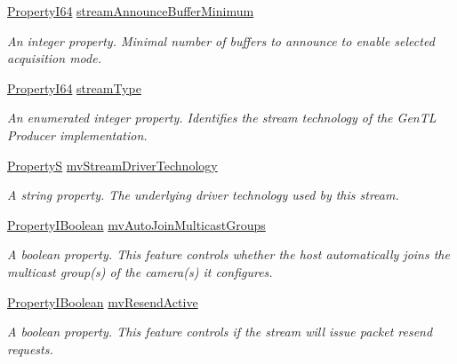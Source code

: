 \begin{DoxyCompactItemize}
\hyperlink{group___common_interface_ga81749b2696755513663492664a18a893}{Property\+I64} \hyperlink{classmv_i_m_p_a_c_t_1_1acquire_1_1_gen_i_cam_1_1_data_stream_module_a3a218f6e6062c463b6eaaf53da37af58}{stream\+Announce\+Buffer\+Minimum}
\begin{DoxyCompactList}\small\item\em An integer property. Minimal number of buffers to announce to enable selected acquisition mode. \end{DoxyCompactList}\item 
\hyperlink{group___common_interface_ga81749b2696755513663492664a18a893}{Property\+I64} \hyperlink{classmv_i_m_p_a_c_t_1_1acquire_1_1_gen_i_cam_1_1_data_stream_module_ada03b278d8c08fd81cdabcb52ef55de5}{stream\+Type}
\begin{DoxyCompactList}\small\item\em An enumerated integer property. Identifies the stream technology of the Gen\+T\+L Producer implementation. \end{DoxyCompactList}\item 
\hyperlink{classmv_i_m_p_a_c_t_1_1acquire_1_1_property_s}{Property\+S} \hyperlink{classmv_i_m_p_a_c_t_1_1acquire_1_1_gen_i_cam_1_1_data_stream_module_a9ab64bbfd598bf9d8f0fb6859ecb3e45}{mv\+Stream\+Driver\+Technology}
\begin{DoxyCompactList}\small\item\em A string property. The underlying driver technology used by this stream. \end{DoxyCompactList}\item 
\hyperlink{group___common_interface_ga44f9437e24b21b6c93da9039ec6786aa}{Property\+I\+Boolean} \hyperlink{classmv_i_m_p_a_c_t_1_1acquire_1_1_gen_i_cam_1_1_data_stream_module_a87ac66bf873cec84754bd58c6d938408}{mv\+Auto\+Join\+Multicast\+Groups}
\begin{DoxyCompactList}\small\item\em A boolean property. This feature controls whether the host automatically joins the multicast group(s) of the camera(s) it configures. \end{DoxyCompactList}\item 
\hyperlink{group___common_interface_ga44f9437e24b21b6c93da9039ec6786aa}{Property\+I\+Boolean} \hyperlink{classmv_i_m_p_a_c_t_1_1acquire_1_1_gen_i_cam_1_1_data_stream_module_a201b0d1ea5837dc3554c269d91f1b431}{mv\+Resend\+Active}
\begin{DoxyCompactList}\small\item\em A boolean property. This feature controls if the stream will issue packet resend requests. \end{DoxyCompactList}\item 

\end{DoxyCompactItemize}
